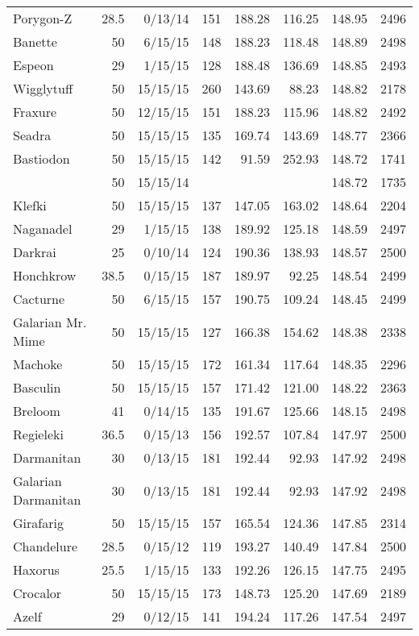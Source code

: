 \begin{longtable}{lrrrrrrr}
Porygon-Z & 28.5 & 0/13/14 & 151 & 188.28 & 116.25 & 148.95 & 2496\\
Banette & 50 & 6/15/15 & 148 & 188.23 & 118.48 & 148.89 & 2498\\
Espeon & 29 & 1/15/15 & 128 & 188.48 & 136.69 & 148.85 & 2493\\
Wigglytuff & 50 & 15/15/15 & 260 & 143.69 & 88.23 & 148.82 & 2178\\
Fraxure & 50 & 12/15/15 & 151 & 188.23 & 115.96 & 148.82 & 2492\\
Seadra & 50 & 15/15/15 & 135 & 169.74 & 143.69 & 148.77 & 2366\\
Bastiodon & 50 & 15/15/15 & 142 & 91.59 & 252.93 & 148.72 & 1741\\
 & 50 & 15/15/14 & & & & 148.72 & 1735\\
Klefki & 50 & 15/15/15 & 137 & 147.05 & 163.02 & 148.64 & 2204\\
Naganadel & 29 & 1/15/15 & 138 & 189.92 & 125.18 & 148.59 & 2497\\
Darkrai & 25 & 0/10/14 & 124 & 190.36 & 138.93 & 148.57 & 2500\\
Honchkrow & 38.5 & 0/15/15 & 187 & 189.97 & 92.25 & 148.54 & 2499\\
Cacturne & 50 & 6/15/15 & 157 & 190.75 & 109.24 & 148.45 & 2499\\
Galarian Mr. Mime & 50 & 15/15/15 & 127 & 166.38 & 154.62 & 148.38 & 2338\\
Machoke & 50 & 15/15/15 & 172 & 161.34 & 117.64 & 148.35 & 2296\\
Basculin & 50 & 15/15/15 & 157 & 171.42 & 121.00 & 148.22 & 2363\\
Breloom & 41 & 0/14/15 & 135 & 191.67 & 125.66 & 148.15 & 2498\\
Regieleki & 36.5 & 0/15/13 & 156 & 192.57 & 107.84 & 147.97 & 2500\\
Darmanitan & 30 & 0/13/15 & 181 & 192.44 & 92.93 & 147.92 & 2498\\
Galarian Darmanitan & 30 & 0/13/15 & 181 & 192.44 & 92.93 & 147.92 & 2498\\
Girafarig & 50 & 15/15/15 & 157 & 165.54 & 124.36 & 147.85 & 2314\\
Chandelure & 28.5 & 0/15/12 & 119 & 193.27 & 140.49 & 147.84 & 2500\\
Haxorus & 25.5 & 1/15/15 & 133 & 192.26 & 126.15 & 147.75 & 2495\\
Crocalor & 50 & 15/15/15 & 173 & 148.73 & 125.20 & 147.69 & 2189\\
Azelf & 29 & 0/12/15 & 141 & 194.24 & 117.26 & 147.54 & 2497\\

\end{longtable}
